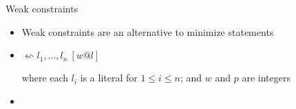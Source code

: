 \begin{frame}[fragile]{Weak constraints}
  \medskip
  \begin{itemize}
  \item<1-> Weak constraints are an alternative to minimize statements
    \smallskip
  \item<2->  \quad $\leftsquigarrow  l_1,\dots, l_n\ [w@l]$

    \smallskip
    where each $l_i$ is a literal for $1\leq i\leq n$;
    and $w$ and $p$ are integers
    \medskip
  \item<3-> 
\begin{semiverbatim}
\end{semiverbatim}
  \end{itemize}
\end{frame}
%
